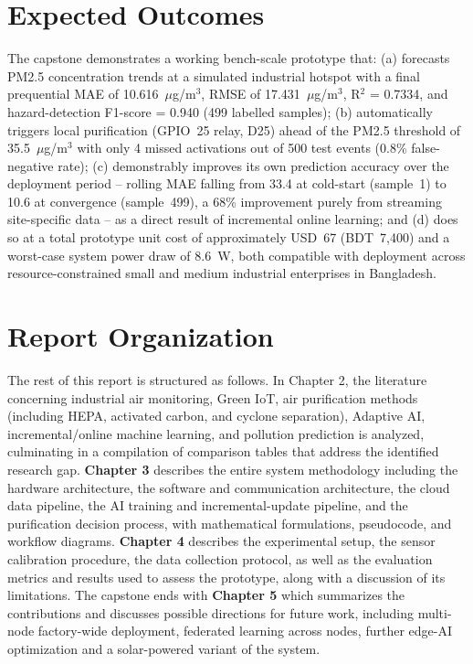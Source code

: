 \section{Expected Outcomes}
\label{sec:expected-outcomes}

The capstone demonstrates a working bench-scale prototype that: (a) forecasts PM2.5 concentration trends at a simulated industrial hotspot with a final prequential MAE of 10.616~$\mu$g/m$^3$, RMSE of 17.431~$\mu$g/m$^3$, R$^2$ = 0.7334, and hazard-detection F1-score = 0.940 (499 labelled samples); (b) automatically triggers local purification (GPIO~25 relay, D25) ahead of the PM2.5 threshold of 35.5~$\mu$g/m$^3$ with only 4 missed activations out of 500 test events (0.8\% false-negative rate); (c) demonstrably improves its own prediction accuracy over the deployment period -- rolling MAE falling from 33.4 at cold-start (sample~1) to 10.6 at convergence (sample~499), a 68\% improvement purely from streaming site-specific data -- as a direct result of incremental online learning; and (d) does so at a total prototype unit cost of approximately USD~67 (BDT~7,400) and a worst-case system power draw of 8.6~W, both compatible with deployment across resource-constrained small and medium industrial enterprises in Bangladesh.

\section{Report Organization}
\label{sec:report-organization}

The rest of this report is structured as follows. In Chapter 2, the literature concerning industrial air monitoring, Green IoT, air purification methods (including HEPA, activated carbon, and cyclone separation), Adaptive AI, incremental/online machine learning, and pollution prediction is analyzed, culminating in a compilation of comparison tables that address the identified research gap. \textbf{Chapter 3} describes the entire system methodology including the hardware architecture, the software and communication architecture, the cloud data pipeline, the AI training and incremental-update pipeline, and the purification decision process, with mathematical formulations, pseudocode, and workflow diagrams. \textbf{Chapter 4} describes the experimental setup, the sensor calibration procedure, the data collection protocol, as well as the evaluation metrics and results used to assess the prototype, along with a discussion of its limitations. The capstone ends with \textbf{Chapter 5} which summarizes the contributions and discusses possible directions for future work, including multi-node factory-wide deployment, federated learning across nodes, further edge-AI optimization and a solar-powered variant of the system.